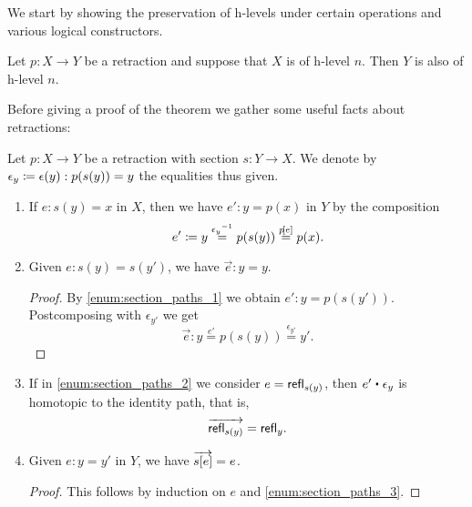We start by showing the preservation of h-levels under certain operations and various logical constructors.

\begin{thm}\label{thm:h-level-retracts}
 Let $p \colon X \to Y$ be a retraction and suppose that $X$ is of h-level $n$. Then $Y$ is also of h-level $n$.
\end{thm}

Before giving a proof of the theorem we gather some useful facts about retractions:

\begin{lem}\label{lem:path_retract}
 Let $p \colon X \to Y$ be a retraction with section $s \colon Y \to X$.
 We denote by $\epsilon_y \coloneqq \epsilon(y) : p(s(y)) = y$ the equalities thus given.
 \begin{enumerate}
  \item \label{enum:section_paths_1}
      If $e : s(y) = x$ in $X$, then we have $e' :  y = p(x)$ in $Y$
        by the composition
     \[e' \coloneqq y \stackrel{\mathord{{\epsilon_y}^{-1}}}{=} p(s(y)) \stackrel{{p}\!\left[{e}\right]}{=} p(x)  .\]

  \item \label{enum:section_paths_2}
      Given $e : s(y) = s(y')$, we have $\vec e : y = y$.
     \begin{proof}
	By \ref{enum:section_paths_1} we obtain $e' : y = p(s(y'))$.
        Postcomposing with $\epsilon_{y'}$ we get
           \[ \overrightarrow{e} : y \stackrel{e'}{=} p(s(y)) \stackrel{\epsilon_{y'}}{=} y'  . \]
     \end{proof}

  \item \label{enum:section_paths_3}
        If in \ref{enum:section_paths_2} we consider $e = \mathsf{refl}_{s(y)}$, then $e' \ct \epsilon_{y}$
        is homotopic to the identity path, that is,
          \[ \overrightarrow{\mathsf{refl}_{s(y)}} = \mathsf{refl}_{y}  . \]

  \item Given $e : y = y'$ in $Y$, we have $\overrightarrow{{s}\!\left[{e}\right]} = e$.
      \begin{proof}
       This follows by induction on $e$ and \ref{enum:section_paths_3}.
      \end{proof}

 \end{enumerate}

\end{lem}



